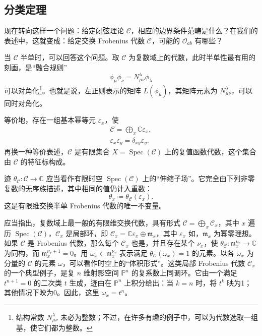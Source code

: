\subsection{分类定理}\label{sec:2.2.1}

现在转向这样一个问题：给定闭弦理论 $\mathcal{C}$，相应的边界条件范畴是什么？在我们的表述中，这就变成：给定交换 Frobenius 代数 $\mathcal{C}$，可能的 $\mathcal{O}_{ab}$ 有哪些？

当 $\mathcal{C}$ 半单时，可以回答这个问题。取 $\mathcal{C}$ 为复数域上的代数，此时半单性最有用的刻画，是“融合规则”
\begin{equation}\label{eq:2.29}
\phi_\mu\phi_\nu=N_{\mu\nu}^{\lambda}\phi_\lambda
\end{equation}
可以对角化\footnote{结构常数 $N_{\mu\nu}^{\lambda}$ 未必为整数；不过，在许多有趣的例子中，可以为代数选取一组基，使它们都为整数。}。也就是说，左正则表示的矩阵 $L(\phi_\mu)$，其矩阵元素为 $N_{\mu\nu}^{\lambda}$，可以同时对角化。

等价地，存在一组基本幂等元 $\varepsilon_x$，使
\begin{equation}\label{eq:2.30}
\begin{gathered}
\mathcal{C}=\bigoplus_x\mathbb{C}\varepsilon_x,\\
\varepsilon_x\varepsilon_y=\delta_{xy}\varepsilon_y.
\end{gathered}
\end{equation}
再换一种等价表述，$\mathcal{C}$ 是有限集合 $X=\operatorname{Spec}(\mathcal{C})$ 上的复值函数代数，这个集合由 $\mathcal{C}$ 的特征标构成。

迹 $\theta_{\mathcal{C}}\colon\mathcal{C}\to\mathbb{C}$ 应当看作有限时空 $\operatorname{Spec}(\mathcal{C})$ 上的“伸缩子场”。它完全由下列非零复数的无序族描述，其中相同的值仍计入重数：
\begin{equation}\label{eq:2.31}
\theta_x\coloneqq\theta_{\mathcal{C}}(\varepsilon_x).
\end{equation}
这是有限维交换半单 Frobenius 代数的唯一不变量。

应当指出，复数域上最一般的有限维交换代数，具有形式 $\mathcal{C}=\bigoplus_x\mathcal{C}_x$，其中 $x$ 遍历 $\operatorname{Spec}(\mathcal{C})$，$\mathcal{C}_x$ 是局部环，即 $\mathcal{C}_x=\mathbb{C}\varepsilon_x\oplus\mathfrak{m}_x$，其中 $\varepsilon_x$ 如，$\mathfrak{m}_x$ 为幂零理想。如果 $\mathcal{C}$ 是 Frobenius 代数，那么每个 $\mathcal{C}_x$ 也是，并且存在某个 $\nu_x$，使 $\theta_{\mathcal{C}}\colon\mathfrak{m}_x^{\nu_x}\to\mathbb{C}$ 为同构，而 $\mathfrak{m}_x^{\nu_x+1}=0$。用 $\omega_x\in\mathfrak{m}_x^{\nu_x}$ 表示满足 $\theta_{\mathcal{C}}(\omega_x)=1$ 的元素。以各 $\omega_x$ 为分量的 $\mathcal{C}$ 的元素 $\omega$，可以看作时空上的“体积形式”。这类局部 Frobenius 代数 $\mathcal{C}_x$ 的一个典型例子，是复 $n$ 维射影空间 $\mathbb{P}^n$ 的复系数上同调环。它由一个满足 $t^{n+1}=0$ 的二次类 $t$ 生成，迹由在 $\mathbb{P}^n$ 上积分给出：当 $k=n$ 时，将 $t^k$ 映为1；其他情况下映为0。因此，这里 $\omega_x=t^n$。

